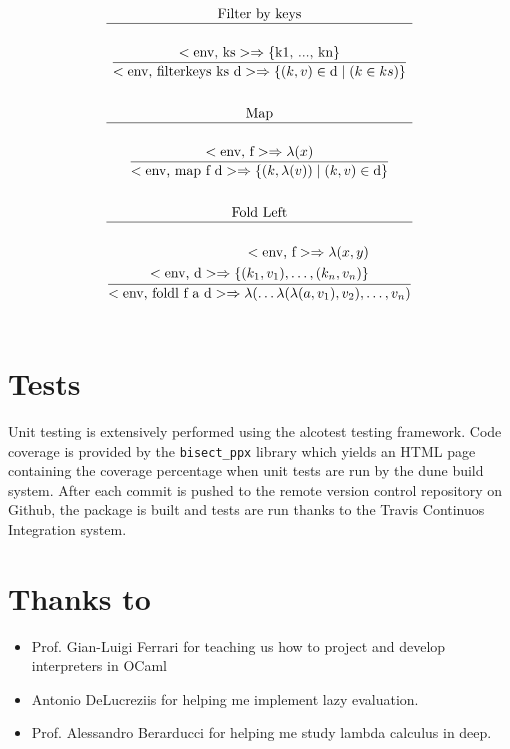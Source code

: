 \documentclass[a4paper, 11pt]{article}
\newcommand{\te}[1]{\text{#1}}
\begin{document}
\begin{multicols}{2}
\begin{gather*}
	\te{Filter by keys} \\ \hline \\
	\dfrac{<\te{env, ks}> \Rightarrow \te{\{k1, ..., kn\}}}{<\te{env, filterkeys ks d}> \Rightarrow \{ (k, v) \in \te{d} \mid (k \in ks) \}} \\ \\
	\te{Map} \\ \hline \\
	\dfrac{<\te{env, f}> \Rightarrow \lambda(x)}{<\te{env, map f d}> \Rightarrow \{ (k, \lambda(v)) \mid (k, v) \in \te{d}  \}} \\ \\
	\te{Fold Left} \\ \hline \\
	\dfrac{\begin{aligned}
		<\te{env, f}> \Rightarrow \lambda(x,y)  \\
		<\te{env, d}> \Rightarrow \{(k_1, v_1), \hdots, (k_n, v_n)\}
	\end{aligned}}{<\te{env, foldl f a d}> \Rightarrow \lambda( \hdots \lambda(\lambda(a, v_1), v_2), \hdots, v_n)} \\ \\
\end{gather*}



\section{Tests}
Unit testing is extensively performed using the alcotest testing framework. Code
coverage is provided by the \texttt{bisect\_ppx} library which yields an HTML
page containing the coverage percentage when unit tests are run by the dune
build system. After each commit is pushed to the remote version control repository on
Github, the package is built and tests are run thanks to the Travis Continuos
Integration system.

\section{Thanks to}

\begin{itemize}
	\item Prof. Gian-Luigi Ferrari for teaching us how to project and develop
	interpreters in OCaml
	\item Antonio DeLucreziis for helping me implement lazy evaluation.
	\item Prof. Alessandro Berarducci for helping me study lambda calculus in deep.
\end{itemize}

\end{multicols}
\end{document}
